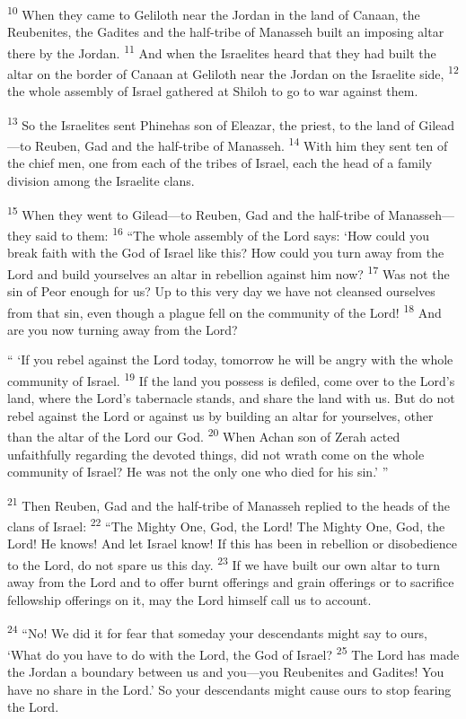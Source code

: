 \documentclass[12pt,twoside]{article}
\newcommand{\vs}[1]{\textsuperscript{#1}}
\begin{document}
\vs{10} When they came to Geliloth near the Jordan in the land of Canaan, the Reubenites, the Gadites and the half-tribe of Manasseh built an imposing altar there by the Jordan.
\vs{11} And when the Israelites heard that they had built the altar on the border of Canaan at Geliloth near the Jordan on the Israelite side,
\vs{12} the whole assembly of Israel gathered at Shiloh to go to war against them.

\vs{13} So the Israelites sent Phinehas son of Eleazar, the priest, to the land of Gilead---to Reuben, Gad and the half-tribe of Manasseh.
\vs{14} With him they sent ten of the chief men, one from each of the tribes of Israel, each the head of a family division among the Israelite clans.

\vs{15} When they went to Gilead---to Reuben, Gad and the half-tribe of Manasseh---they said to them:
\vs{16} ``The whole assembly of the Lord says: `How could you break faith with the God of Israel like this? How could you turn away from the Lord and build yourselves an altar in rebellion against him now?
\vs{17} Was not the sin of Peor enough for us? Up to this very day we have not cleansed ourselves from that sin, even though a plague fell on the community of the Lord!
\vs{18} And are you now turning away from the Lord?

`` `If you rebel against the Lord today, tomorrow he will be angry with the whole community of Israel.
\vs{19} If the land you possess is defiled, come over to the Lord's land, where the Lord's tabernacle stands, and share the land with us. But do not rebel against the Lord or against us by building an altar for yourselves, other than the altar of the Lord our God.
\vs{20} When Achan son of Zerah acted unfaithfully regarding the devoted things, did not wrath come on the whole community of Israel? He was not the only one who died for his sin.' ''

\vs{21} Then Reuben, Gad and the half-tribe of Manasseh replied to the heads of the clans of Israel:
\vs{22} ``The Mighty One, God, the Lord! The Mighty One, God, the Lord! He knows! And let Israel know! If this has been in rebellion or disobedience to the Lord, do not spare us this day.
\vs{23} If we have built our own altar to turn away from the Lord and to offer burnt offerings and grain offerings or to sacrifice fellowship offerings on it, may the Lord himself call us to account.

\vs{24} ``No! We did it for fear that someday your descendants might say to ours, `What do you have to do with the Lord, the God of Israel?
\vs{25} The Lord has made the Jordan a boundary between us and you---you Reubenites and Gadites! You have no share in the Lord.' So your descendants might cause ours to stop fearing the Lord.
\end{document}
